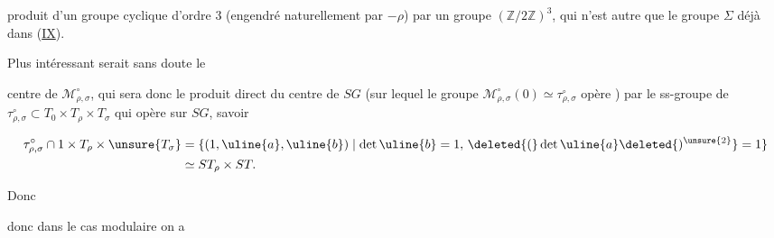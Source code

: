 produit d'un groupe cyclique d'ordre $3$ (engendré naturellement par $-\rho$) par un groupe $(\mathbb Z/2\mathbb Z)^3$, qui n'est autre que le groupe $\Sigma$ déjà dans (\uline{IX}).

Plus intéressant serait sans doute le


centre de $\mathcal{M}_{\rho,\sigma}^{\circ}$, qui sera donc le produit direct du centre  de $SG$ (sur lequel le groupe  $\mathcal{M}_{\rho,\sigma}^{\circ}(0)\simeq\tau_{\rho,\sigma}^{\circ}$ opère ) par le ss-groupe de $\tau_{\rho,\sigma}^{\circ}\subset T_0\times T_\rho\times T_\sigma$ qui opère  sur $SG$, savoir \deleted{$\unsure{\tau_{\rho,\sigma}}$}


\[
\begin{aligned}
\tau_{\rho,\sigma}^{\circ}\cap 1\times T_\rho\times\unsure{T_\sigma}
 &=\{(1,\uline{a},\uline{b})\mid\det\uline{b}=1,\,
 \deleted{(}\det\uline{a}\deleted{)^{\unsure{2}}}=1\}\\
 &\simeq ST_\rho\times ST.
\end{aligned}
\]

Donc

\deleted{\diagram{\[\begin{array}{rcl}
(53)\quad\uline{\mathrm{Centre}}(\mathcal{M}_{\rho,\sigma}^{\circ})
 &=&(1\times ST_\rho\times ST_\sigma)\times\mu_2\quad,\\
 &&\hfill\cap\qquad\\[-2pt]
 &&\hfill SG\qquad
\end{array}\]}}


donc dans le cas modulaire on a


